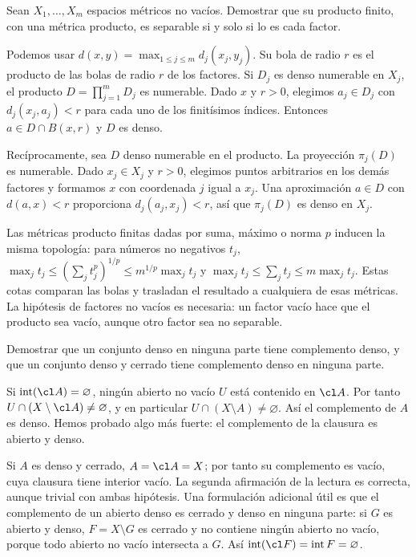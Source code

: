 \begin{ejercicio}\label{ej:lectura-6-5}
Sean $X_1,\ldots,X_m$ espacios métricos no vacíos. Demostrar que su producto finito, con una métrica producto, es separable si y solo si lo es cada factor.
\end{ejercicio}
\begin{solucion}
Podemos usar $d(x,y)=\max_{1\le j\le m}d_j(x_j,y_j)$. Su bola de radio $r$ es el producto de las bolas de radio $r$ de los factores. Si $D_j$ es denso numerable en $X_j$, el producto $D=\prod_{j=1}^mD_j$ es numerable. Dado $x$ y $r>0$, elegimos $a_j\in D_j$ con $d_j(x_j,a_j)<r$ para cada uno de los finitísimos índices. Entonces $a\in D\cap B(x,r)$ y $D$ es denso.

Recíprocamente, sea $D$ denso numerable en el producto. La proyección $\pi_j(D)$ es numerable. Dado $x_j\in X_j$ y $r>0$, elegimos puntos arbitrarios en los demás factores y formamos $x$ con coordenada $j$ igual a $x_j$. Una aproximación $a\in D$ con $d(a,x)<r$ proporciona $d_j(a_j,x_j)<r$, así que $\pi_j(D)$ es denso en $X_j$.

Las métricas producto finitas dadas por suma, máximo o norma $p$ inducen la misma topología: para números no negativos $t_j$, $\max_jt_j\le(\sum_jt_j^p)^{1/p}\le m^{1/p}\max_jt_j$ y $\max_jt_j\le\sum_jt_j\le m\max_jt_j$. Estas cotas comparan las bolas y trasladan el resultado a cualquiera de esas métricas. La hipótesis de factores no vacíos es necesaria: un factor vacío hace que el producto sea vacío, aunque otro factor sea no separable.
\end{solucion}

\begin{ejercicio}\label{ej:lectura-6-6}
Demostrar que un conjunto denso en ninguna parte tiene complemento denso, y que un conjunto denso y cerrado tiene complemento denso en ninguna parte.
\end{ejercicio}
\begin{solucion}
Si $\operatorname{int}(\cl A)=\varnothing$, ningún abierto no vacío $U$ está contenido en $\cl A$. Por tanto $U\cap(X\setminus\cl A)\ne\varnothing$, y en particular $U\cap(X\setminus A)\ne\varnothing$. Así el complemento de $A$ es denso. Hemos probado algo más fuerte: el complemento de la clausura es abierto y denso.

Si $A$ es denso y cerrado, $A=\cl A=X$; por tanto su complemento es vacío, cuya clausura tiene interior vacío. La segunda afirmación de la lectura es correcta, aunque trivial con ambas hipótesis. Una formulación adicional útil es que el complemento de un abierto denso es cerrado y denso en ninguna parte: si $G$ es abierto y denso, $F=X\setminus G$ es cerrado y no contiene ningún abierto no vacío, porque todo abierto no vacío intersecta a $G$. Así $\operatorname{int}(\cl F)=\operatorname{int}F=\varnothing$.
\end{solucion}

